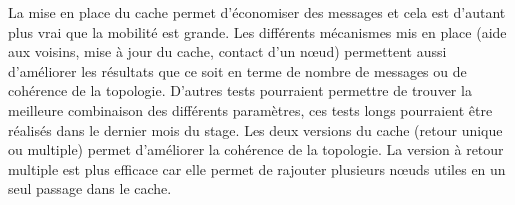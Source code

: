 La mise en place du cache permet d'économiser des messages et cela est d'autant plus vrai que la mobilité est grande. Les différents mécanismes mis en place (aide aux voisins, mise à jour du cache, contact d'un nœud) permettent aussi d'améliorer les résultats que ce soit en terme de nombre de messages ou de cohérence de la topologie. D'autres tests pourraient permettre de trouver la meilleure combinaison des différents paramètres, ces tests longs pourraient être réalisés dans le dernier mois du stage. Les deux versions du cache (retour unique ou multiple) permet d'améliorer la cohérence de la topologie. La version à retour multiple est plus efficace car elle permet de rajouter plusieurs nœuds utiles en un seul passage dans le cache.
 
